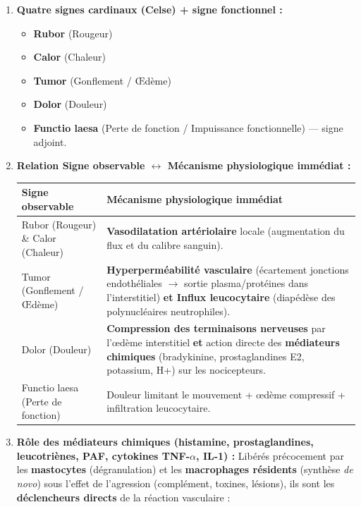 \documentclass[11pt]{article}
\begin{document}
\begin{corrige}
\begin{enumerate}
    \item \textbf{Quatre signes cardinaux (Celse) + signe fonctionnel :}
    \begin{itemize}
        \item \textbf{Rubor} (Rougeur)
        \item \textbf{Calor} (Chaleur)
        \item \textbf{Tumor} (Gonflement / Œdème)
        \item \textbf{Dolor} (Douleur)
        \item \textbf{Functio laesa} (Perte de fonction / Impuissance fonctionnelle) — signe adjoint.
    \end{itemize}
    \item \textbf{Relation Signe observable $\leftrightarrow$ Mécanisme physiologique immédiat :}
    \begin{center}
    \begin{tabularx}{\linewidth}{|l|X|}\hline
    \textbf{Signe observable} & \textbf{Mécanisme physiologique immédiat} \\ \hline
    Rubor (Rougeur) \& Calor (Chaleur) & \textbf{Vasodilatation artériolaire} locale (augmentation du flux et du calibre sanguin). \\ \hline
    Tumor (Gonflement / Œdème) & \textbf{Hyperperméabilité vasculaire} (écartement jonctions endothéliales $\rightarrow$ sortie plasma/protéines dans l'interstitiel) \textbf{et Influx leucocytaire} (diapédèse des polynucléaires neutrophiles). \\ \hline
    Dolor (Douleur) & \textbf{Compression des terminaisons nerveuses} par l'œdème interstitiel \textbf{et} action directe des \textbf{médiateurs chimiques} (bradykinine, prostaglandines E2, potassium, H+) sur les nocicepteurs. \\ \hline
    Functio laesa (Perte de fonction) & Douleur limitant le mouvement + œdème compressif + infiltration leucocytaire. \\ \hline
    \end{tabularx}
    \end{center}
    \item \textbf{Rôle des médiateurs chimiques (histamine, prostaglandines, leucotriènes, PAF, cytokines TNF-$\alpha$, IL-1) :}
    Libérés précocement par les \textbf{mastocytes} (dégranulation) et les \textbf{macrophages résidents} (synthèse \emph{de novo}) sous l'effet de l'agression (complément, toxines, lésions), ils sont les \textbf{déclencheurs directs} de la réaction vasculaire :

\end{enumerate}
\end{corrige}
\end{document}
